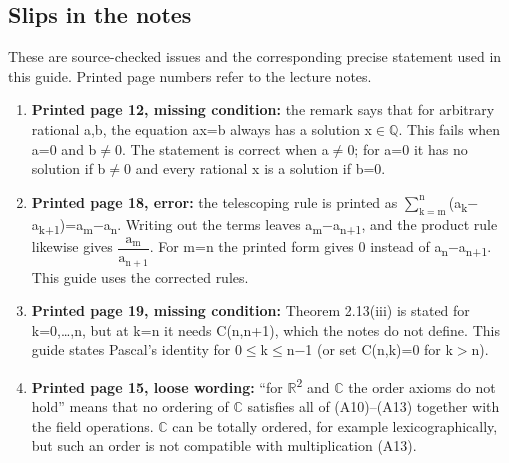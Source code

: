 \documentclass[11pt]{article}
\begin{document}
\begin{keepsection}
\begin{keepsection}
\end{keepsection}
\end{keepsection}

\begin{keepsection}
\section{Slips in the notes}

These are source-checked issues and the corresponding precise statement used in this guide. Printed page numbers refer to the lecture notes.

\begin{enumerate}
\item \textbf{Printed page 12, missing condition:} the remark says that for arbitrary rational a,b, the equation ax=b always has a solution x\ensuremath{\in}\ensuremath{\mathbb{Q}}. This fails when a=0 and b\ensuremath{\neq}0. The statement is correct when a\ensuremath{\neq}0; for a=0 it has no solution if b\ensuremath{\neq}0 and every rational x is a solution if b=0.
\item \textbf{Printed page 18, error:} the telescoping rule is printed as $\sum_{\mathrm{k}=\mathrm{m}}^{\mathrm{n}} $(a\textsubscript{k}\ensuremath{-}a\textsubscript{k+1})=a\textsubscript{m}\ensuremath{-}a\textsubscript{n}. Writing out the terms leaves a\textsubscript{m}\ensuremath{-}a\textsubscript{n+1}, and the product rule likewise gives {\small\ensuremath{\dfrac{\mathrm{a}_{\mathrm{m}}}{\mathrm{a}_{\mathrm{n}+1}}}}. For m=n the printed form gives 0 instead of a\textsubscript{n}\ensuremath{-}a\textsubscript{n+1}. This guide uses the corrected rules.
\item \textbf{Printed page 19, missing condition:} Theorem 2.13(iii) is stated for k=0,…,n, but at k=n it needs C(n,n+1), which the notes do not define. This guide states Pascal’s identity for 0\ensuremath{\leq}k\ensuremath{\leq}n\ensuremath{-}1 (or set C(n,k)=0 for k\ensuremath{>}n).
\item \textbf{Printed page 15, loose wording:} “for \ensuremath{\mathbb{R}}\textsuperscript{2} and \ensuremath{\mathbb{C}} the order axioms do not hold” means that no ordering of \ensuremath{\mathbb{C}} satisfies all of (A10)–(A13) together with the field operations. \ensuremath{\mathbb{C}} can be totally ordered, for example lexicographically, but such an order is not compatible with multiplication (A13).
\end{enumerate}
\end{keepsection}
\end{document}
